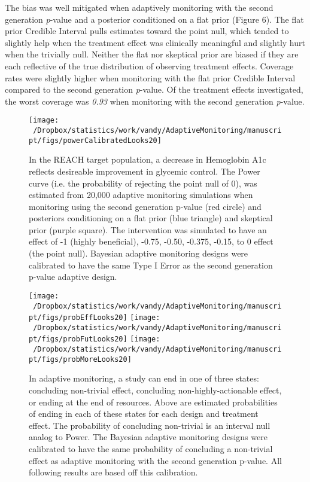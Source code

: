 \documentclass[12pt,oneside]{book}
\newlength{\li}\setlength{\li}{14.48pt}
\newlength{\di}\setlength{\di}{-3.5mm}
\theoremstyle{definition}
\theoremstyle{definition}
\theoremstyle{definition}
\theoremstyle{remark}
\begin{document}
The bias was well mitigated when adaptively monitoring with the second
generation \emph{p}-value and a posterior conditioned on a flat prior
(Figure 6). The flat prior Credible Interval pulls estimates toward the
point null, which tended to slightly help when the treatment effect was
clinically meaningful and slightly hurt when the trivially null. Neither
the flat nor skeptical prior are biased if they are each reflective of
the true distribution of observing treatment effects. Coverage rates
were slightly higher when monitoring with the flat prior Credible
Interval compared to the second generation \emph{p}-value. Of the
treatment effects investigated, the worst coverage was \emph{0.93} when
monitoring with the second generation \emph{p}-value.

\begin{figure}[H]

{\centering \texttt{[image: ~/Dropbox/statistics/work/vandy/AdaptiveMonitoring/manuscript/figs/powerCalibratedLooks20]} 

}

\caption{In the REACH target population, a decrease in Hemoglobin A1c reflects desireable improvement in glycemic control.  The Power curve (i.e. the probability of rejecting the point null of 0), was estimated from 20,000 adaptive monitoring simulations when monitoring using the second generation p-value (red circle) and posteriors conditioning on a flat prior (blue triangle) and skeptical prior (purple square).  The intervention was simulated to have an effect of -1 (highly beneficial), -0.75, -0.50, -0.375, -0.15, to 0 effect (the point null).  Bayesian adaptive monitoring designs were calibrated to have the same Type I Error as the second generation p-value adaptive design.}\label{fig:Power}
\end{figure}

\begin{figure}[H]

{\centering \texttt{[image: ~/Dropbox/statistics/work/vandy/AdaptiveMonitoring/manuscript/figs/probEffLooks20]} \texttt{[image: ~/Dropbox/statistics/work/vandy/AdaptiveMonitoring/manuscript/figs/probFutLooks20]} \texttt{[image: ~/Dropbox/statistics/work/vandy/AdaptiveMonitoring/manuscript/figs/probMoreLooks20]} 

}

\caption{In adaptive monitoring, a study can end in one of three states: concluding non-trivial effect, concluding non-highly-actionable effect, or ending at the end of resources.  Above are estimated probabilities of ending in each of these states for each design and treatment effect.  The probability of concluding non-trivial is an interval null analog to Power.  The Bayesian adaptive monitoring designs were calibrated to have the same probability of concluding a non-trivial effect as adaptive monitoring with the second generation p-value.  All following results are based off this calibration.}\label{fig:state}
\end{figure}
\end{document}
